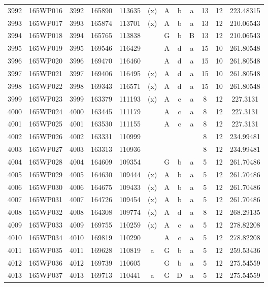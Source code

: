 \begin{tabular}{|*{12}{c|}}
3992 & 165WP016 & 3992 & 165890 & 113635 & (x) & A & b & a & 13 & 12 & 223.48315 \\ 
3993 & 165WP017 & 3993 & 165874 & 113701 & (x) & A & b & a & 13 & 12 & 210.06543 \\ 
3994 & 165WP018 & 3994 & 165765 & 113838 &  & G & b & B & 13 & 12 & 210.06543 \\ 
3995 & 165WP019 & 3995 & 169546 & 116429 &  & A & d & a & 15 & 10 & 261.80548 \\ 
3996 & 165WP020 & 3996 & 169470 & 116460 &  & A & d & a & 15 & 10 & 261.80548 \\ 
3997 & 165WP021 & 3997 & 169406 & 116495 & (x) & A & d & a & 15 & 10 & 261.80548 \\ 
3998 & 165WP022 & 3998 & 169343 & 116571 & (x) & A & d & a & 15 & 10 & 261.80548 \\ 
3999 & 165WP023 & 3999 & 163379 & 111193 & (x) & A & c & a & 8 & 12 & 227.3131 \\ 
4000 & 165WP024 & 4000 & 163445 & 111179 &  & A & c & a & 8 & 12 & 227.3131 \\ 
4001 & 165WP025 & 4001 & 163530 & 111155 &  & A & c & a & 8 & 12 & 227.3131 \\ 
4002 & 165WP026 & 4002 & 163331 & 110999 &  &  &  &  & 8 & 12 & 234.99481 \\ 
4003 & 165WP027 & 4003 & 163313 & 110936 &  &  &  &  & 8 & 12 & 234.99481 \\ 
4004 & 165WP028 & 4004 & 164609 & 109354 &  & G & b & a & 5 & 12 & 261.70486 \\ 
4005 & 165WP029 & 4005 & 164630 & 109444 & (x) & A & b & a & 5 & 12 & 261.70486 \\ 
4006 & 165WP030 & 4006 & 164675 & 109433 & (x) & A & b & a & 5 & 12 & 261.70486 \\ 
4007 & 165WP031 & 4007 & 164726 & 109454 & (x) & A & b & a & 5 & 12 & 261.70486 \\ 
4008 & 165WP032 & 4008 & 164308 & 109774 & (x) & A & d & a & 8 & 12 & 268.29135 \\ 
4009 & 165WP033 & 4009 & 169755 & 110259 & (x) & A & c & a & 5 & 12 & 278.82208 \\ 
4010 & 165WP034 & 4010 & 169819 & 110290 &  & A & c & a & 5 & 12 & 278.82208 \\ 
4011 & 165WP035 & 4011 & 169628 & 110819 & a & G & b & a & 5 & 12 & 259.53436 \\ 
4012 & 165WP036 & 4012 & 169739 & 110605 &  & G & b & a & 5 & 12 & 275.54559 \\ 
4013 & 165WP037 & 4013 & 169713 & 110441 & a & G & D & a & 5 & 12 & 275.54559 \\ 

\end{tabular}
